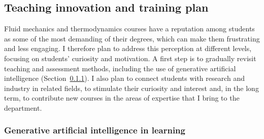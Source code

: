\documentclass[11pt]{article}
\begin{document}
\subsection{Teaching innovation and training plan}\label{sec:innovation}

Fluid mechanics and thermodynamics courses have a reputation among students as some of the most demanding of their degrees, which can make them frustrating and less engaging.
I therefore plan to address this perception at different levels, focusing on students' curiosity and motivation.
A first step is to gradually revisit teaching and assessment methods, including the use of generative artificial intelligence (Section~\ref{sec:ai}).
I also plan to connect students with research and industry in related fields, to stimulate their curiosity and interest and, in the long term, to contribute new courses in the areas of expertise that I bring to the department.

\subsubsection{Generative artificial intelligence in learning}\label{sec:ai}
\end{document}
